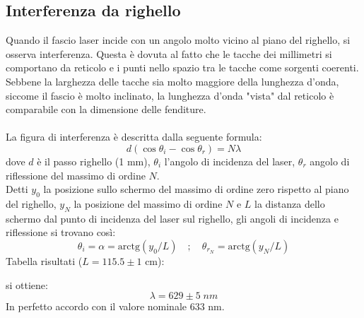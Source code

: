 \subsection{Interferenza da righello}
Quando il fascio laser incide con un angolo molto vicino al piano del righello, si osserva interferenza. Questa è dovuta al fatto che le tacche dei millimetri si comportano da reticolo e i punti nello spazio tra le tacche come sorgenti coerenti. Sebbene la larghezza delle tacche sia molto maggiore della lunghezza d'onda, siccome il fascio è molto inclinato, la lunghezza d'onda "vista" dal reticolo è comparabile con la dimensione delle fenditure.\\\\
%
La figura di interferenza è descritta dalla seguente formula:
%
    $$ d(\cos\theta_i - \cos\theta_r) =  N \lambda $$
%
dove $d$ è il passo righello (1 mm), $\theta_i$ l'angolo di incidenza del laser, $\theta_r$ angolo di riflessione del massimo di ordine $N$.\\
Detti $y_0$ la posizione sullo schermo del massimo di ordine zero rispetto al piano del righello, $y_N$ la posizione del massimo di ordine $N$ e $L$ la distanza dello schermo dal punto di incidenza del laser sul righello, gli angoli di incidenza e riflessione si trovano così:
$$ \theta_i = \alpha = \mathrm{arctg}(y_0 / L) \quad ; \quad \theta_{r_N} = \mathrm{arctg}( y_N / L ) $$
%
Tabella risultati ($L = 115.5 \pm 1$ cm):

si ottiene:
    $$ \lambda = 629 \pm 5 \; nm $$
In perfetto accordo con il valore nominale $633$ nm.
